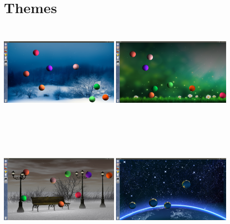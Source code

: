 \documentclass[a4paper,12pt]{report}
\begin{document}
\section{Themes}
\begin{center}
\includegraphics[height=5cm ,width=6cm]{t1.png}
\includegraphics[height=5cm, width=6cm]{t2.png}
\end{center}\\
\begin{center}
\includegraphics[height=5cm, width=6cm]{t3.png}
\includegraphics[height=5cm, width=6cm]{t4.png}
\end{center}\\\\
\end{document}
